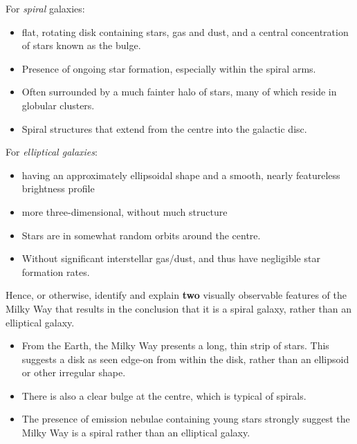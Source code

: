 \documentclass[a4paper,11pt,draft]{exam}
\begin{document}
\begin{questions}
\begin{solution}
		For \textit{spiral} galaxies:
		\begin{itemize}
			\item flat, rotating disk containing stars, gas and dust, and a central concentration of stars known as the bulge. 
			\item Presence of ongoing star formation, especially within the spiral arms.
			\item Often surrounded by a much fainter halo of stars, many of which reside in globular clusters. 
			\item Spiral structures that extend from the centre into the galactic disc. 
		\end{itemize}
		For \textit{elliptical galaxies}:
		\begin{itemize}
			\item having an approximately ellipsoidal shape and a smooth, nearly featureless brightness profile 
			\item more three-dimensional, without much structure
			\item Stars are in somewhat random orbits around the centre.
			\item Without significant interstellar gas/dust, and thus have negligible star formation rates.
		\end{itemize}
	\end{solution}
	
\question[4]
	Hence, or otherwise, identify and explain \textbf{two} visually observable features of the Milky Way that results in the conclusion that it is a spiral galaxy, rather than an elliptical galaxy.
	\droppoints
	\begin{solution}
		\begin{itemize}
			\item From the Earth, the Milky Way presents a long, thin strip of stars. This suggests a disk as seen edge-on from within the disk, rather than an ellipsoid or other irregular shape.
			\item There is also a clear bulge at the centre, which is typical of spirals.
			\item The presence of emission nebulae containing young stars strongly suggest the Milky Way is a spiral rather than an elliptical galaxy.
		\end{itemize}
	\end{solution}


\end{questions}
\end{document}
